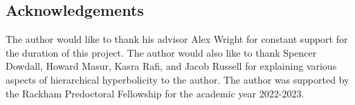 \subsection*{Acknowledgements}

The author would like to thank his advisor Alex Wright for constant support for the duration of this project.
The author would also like to thank Spencer Dowdall, Howard Masur, Kasra Rafi, and Jacob Russell for explaining various aspects of hierarchical hyperbolicity to the author.
The author was supported by the Rackham Predoctoral Fellowship for the academic year 2022-2023.




